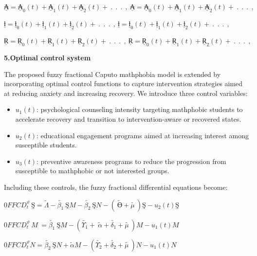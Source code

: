 \documentclass[
]{article}
\begin{document}
\(\underline{₳} = {\underline{₳}}_{0}(t) + {\underline{₳}}_{1}(t) + {\underline{₳}}_{2}(t) + \ .\ \ .\ \ .\ \ ,\ \underline{₳} = {\underline{₳}}_{0}(t) + {\underline{₳}}_{1}(t) + {\underline{₳}}_{2}(t) + \ .\ \ .\ \ .\ \ ,\)

\(\underline{ƚ} = {\underline{ƚ}}_{0}(t) + {\underline{ƚ}}_{1}(t) + {\underline{ƚ}}_{2}(t) + \ .\ \ .\ \ .\ \ ,\ \underline{ƚ} = {\underline{ƚ}}_{0}(t) + {\underline{ƚ}}_{1}(t) + {\underline{ƚ}}_{2}(t) + \ .\ \ .\ \ .\ \ ,\)

\(\underline{Ɍ} = {\underline{Ɍ}}_{0}(t) + {\underline{Ɍ}}_{1}(t) + {\underline{Ɍ}}_{2}(t) + \ .\ \ .\ \ .\ \ ,\ \underline{Ɍ} = {\underline{Ɍ}}_{0}(t) + {\underline{Ɍ}}_{1}(t) + {\underline{Ɍ}}_{2}(t) + \ .\ \ .\ \ .\ \ ,\)

\textbf{5.Optimal control system}

The proposed fuzzy fractional Caputo mathphobia model is extended by incorporating optimal control functions to capture intervention strategies aimed at reducing anxiety and increasing recovery. We introduce three control variables:

\begin{itemize}
\item
  \(u_{1}(t)\): psychological counseling intensity targeting mathphobic students to accelerate recovery and transition to intervention-aware or recovered states.
\item
  \(u_{2}(t)\): educational engagement programs aimed at increasing interest among susceptible students.
\item
  \(u_{3}(t)\): preventive awareness programs to reduce the progression from susceptible to mathphobic or not interested groups.
\end{itemize}

Including these controls, the fuzzy fractional differential equations become:

\(0FFCD_{t}^{\vartheta}\ Ş = \widetilde{\Lambda} - \widetilde{\beta_{1}}\ ŞM - \widetilde{\beta_{2}}\ ŞN - \left( \ \widetilde{Ө} + \widetilde{\mu\ } \right)Ş - u_{2}(t)Ş\)

\(0FFCD_{t}^{\vartheta}\ M\  = \widetilde{\beta_{1}}\ ŞM - \left( \widetilde{\Upsilon_{1}} + \ \widetilde{\alpha} + \widetilde{\delta_{1}} + \widetilde{\mu\ } \right)M - u_{1}(t)M\)

\(0FFCD_{t}^{\vartheta}N = \widetilde{\beta_{2}}\ ŞN + \widetilde{\alpha}M - \left( \widetilde{\Upsilon_{2}} + \widetilde{\delta_{2}} + \widetilde{\mu\ } \right)N - u_{1}(t)N\)
\end{document}
